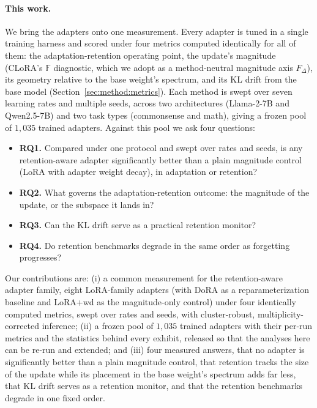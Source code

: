\documentclass[11pt]{article}
\newcommand{\dw}{F_{\Delta}}
\begin{document}
\paragraph{This work.} We bring the adapters onto one measurement. Every
adapter is tuned in a single training harness and scored under four metrics
computed identically for all of them: the adaptation-retention operating
point, the update's magnitude (CLoRA's $\mathbb{F}$ diagnostic, which we
adopt as a method-neutral magnitude axis $\dw$), its geometry relative to the
base weight's spectrum, and its KL drift from the base model
(Section~\ref{sec:method:metrics}). Each method is swept over seven learning
rates and multiple seeds, across two architectures (Llama-2-7B and
Qwen2.5-7B) and two task types (commonsense and math), giving a frozen pool
of $1{,}035$ trained adapters.
Against this pool we ask four questions:
\begin{itemize}
  \item \textbf{RQ1.} Compared under one protocol and swept over rates and seeds, is any retention-aware adapter significantly better than a plain magnitude control (LoRA with adapter weight decay), in adaptation or retention?
  \item \textbf{RQ2.} What governs the adaptation-retention outcome: the
  magnitude of the update, or the subspace it lands in?
  \item \textbf{RQ3.} Can the KL drift serve as a practical retention monitor?
  \item \textbf{RQ4.} Do retention benchmarks degrade in the same order as forgetting progresses?
\end{itemize}
Our contributions are: (i) a common measurement for the retention-aware
adapter family, eight LoRA-family adapters (with DoRA as a reparameterization
baseline and LoRA{+}wd as the magnitude-only control) under four identically
computed metrics, swept over rates and seeds, with cluster-robust,
multiplicity-corrected inference; (ii) a frozen pool of $1{,}035$ trained
adapters with their per-run metrics and the statistics behind every exhibit,
released so that the analyses here can be re-run and extended; and (iii) four
measured answers, that no adapter is significantly better than a plain
magnitude control, that retention tracks the size of the update while its
placement in the base weight's spectrum adds far less, that KL drift serves as
a retention monitor, and that the retention benchmarks degrade in one fixed
order.
\end{document}
